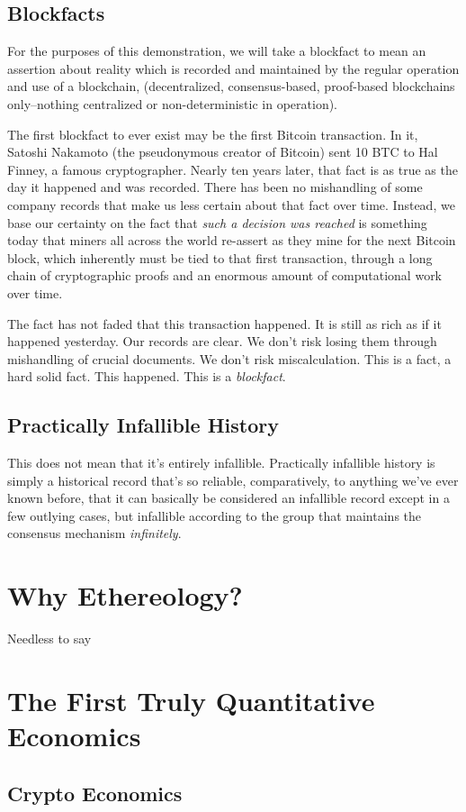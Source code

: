 \documentclass[a4paper,oneside]{article}
\begin{document}
\begin{multicols}{2}
\subsection{Blockfacts}
 For the purposes of this demonstration, we will take a blockfact to mean an assertion about reality which is recorded and maintained by the regular operation and use of a blockchain, (decentralized, consensus-based, proof-based blockchains only--nothing centralized or non-deterministic in operation).
 
 The first blockfact to ever exist may be the first Bitcoin transaction. In it, Satoshi Nakamoto (the pseudonymous creator of Bitcoin) sent 10 BTC to Hal Finney, a famous cryptographer. Nearly ten years later, that fact is as true as the day it happened and was recorded. There has been no mishandling of some company records that make us less certain about that fact over time. Instead, we base our certainty on the fact that \textit{such a decision was reached} is something today that miners all across the world re-assert as they mine for the next  Bitcoin block, which inherently must be tied to that first transaction, through a long chain of cryptographic proofs and an enormous amount of computational work over time.
 
 The fact has not faded that this transaction happened. It is still as rich as if it happened yesterday. Our records are clear. We don't risk losing them through mishandling of crucial documents. We don't risk miscalculation. This is a fact, a hard solid fact. This happened. This is a \textit{blockfact}.
 
 \subsection{Practically Infallible History}
 This does not mean that it's entirely infallible. Practically infallible history is simply a historical record that's so reliable, comparatively, to anything we've ever known before, that it can basically be considered an infallible record except in a few outlying cases, but infallible according to the group that maintains the consensus mechanism \textit{infinitely}.
 
\section{Why Ethereology?}

Needless to say

\begin{tikzpicture}[]

\end{tikzpicture}

\section{The First Truly Quantitative Economics}
\subsection{Crypto Economics}

\end{multicols}
\end{document}

